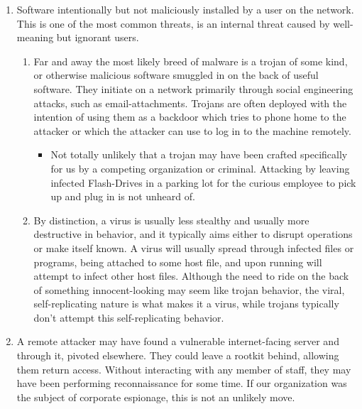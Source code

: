\begin{enumerate}
\def\labelenumi{\arabic{enumi}.}
\item
  Software intentionally but not maliciously installed by a user on the
  network. This is one of the most common threats, is an internal threat
  caused by well-meaning but ignorant users.

  \begin{enumerate}
  \def\labelenumii{\arabic{enumii}.}
  \item
    Far and away the most likely breed of malware is a trojan of some
    kind, or otherwise malicious software smuggled in on the back of
    useful software. They initiate on a network primarily through social
    engineering attacks, such as email-attachments. Trojans are often
    deployed with the intention of using them as a backdoor which tries
    to phone home to the attacker or which the attacker can use to log
    in to the machine remotely.

    \begin{itemize}
    \tightlist
    \item
      Not totally unlikely that a trojan may have been crafted
      specifically for us by a competing organization or criminal.
      Attacking by leaving infected Flash-Drives in a parking lot for
      the curious employee to pick up and plug in is not unheard of.
    \end{itemize}
  \item
    By distinction, a virus is usually less stealthy and usually more
    destructive in behavior, and it typically aims either to disrupt
    operations or make itself known. A virus will usually spread through
    infected files or programs, being attached to some host file, and
    upon running will attempt to infect other host files. Although the
    need to ride on the back of something innocent-looking may seem like
    trojan behavior, the viral, self-replicating nature is what makes it
    a virus, while trojans typically don't attempt this self-replicating
    behavior.
  \end{enumerate}
\item
  A remote attacker may have found a vulnerable internet-facing server
  and through it, pivoted elsewhere. They could leave a rootkit behind,
  allowing them return access. Without interacting with any member of
  staff, they may have been performing reconnaissance for some time. If
  our organization was the subject of corporate espionage, this is not
  an unlikely move.
\end{enumerate}

